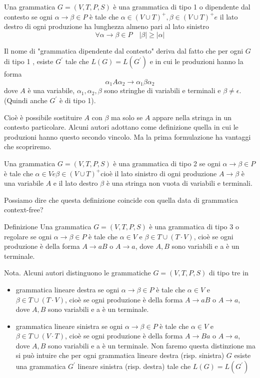 \vspace{5mm}

Una grammatica $G=(V, T, P, S)$ è una grammatica di tipo 1 o dipendente dal contesto se ogni $\alpha \rightarrow \beta \in P$ è tale che $\alpha \in(V \cup T)^{+}, \beta \in(V \cup T)^{+} e$ il lato destro di ogni produzione ha lunghezza almeno pari al lato sinistro
$$
\forall \alpha \rightarrow \beta \in P \quad |\beta| \geq |\alpha|
$$

Il nome di "grammatica dipendente dal contesto" deriva dal fatto che per ogni $G$ di tipo 1 , esiste $G^{\prime}$ tale che $L(G)=L\left(G^{\prime}\right)$ e in cui le produzioni hanno la forma
$$
\alpha_{1} A \alpha_{2} \rightarrow \alpha_{1} \beta \alpha_{2}
$$
dove $A$ è una variabile, $\alpha_{1}, \alpha_{2}, \beta$ sono stringhe di variabili e terminali e $\beta \neq \epsilon$. (Quindi anche $G^{\prime}$ è di tipo 1).

Cioè è possibile sostituire $A$ con $\beta$ ma solo se $A$ appare nella stringa in un contesto particolare.
Alcuni autori adottano come definizione quella in cui le produzioni hanno questo secondo vincolo. Ma la prima formulazione ha vantaggi che scopriremo.

\vspace{5mm}

Una grammatica $G=(V, T, P, S)$ è una grammatica di tipo 2 se ogni $\alpha \rightarrow \beta \in P$ è tale che $\alpha \in V e \beta \in(V \cup T)^{+}$cioè il lato sinistro di ogni produzione $A \rightarrow \beta$ è una variabile $A$ e il lato destro $\beta$ è una stringa non vuota di variabili e terminali.

Possiamo dire che questa definizione coincide con quella data di grammatica context-free?

\vspace{5mm}

Definizione
Una grammatica $G=(V, T, P, S)$ è una grammatica di tipo 3 o regolare se ogni $\alpha \rightarrow \beta \in P$ è tale che $\alpha \in V$ e $\beta \in T \cup(T \cdot V)$, cioè se ogni produzione è della forma $A \rightarrow a B$ o $A \rightarrow a$, dove $A, B$ sono variabili e a è un terminale.

Nota. Alcuni autori distinguono le grammatiche $G=(V, T, P, S)$ di tipo tre in
\begin{itemize}
    \item grammatica lineare destra se ogni $\alpha \rightarrow \beta \in P$ è tale che $\alpha \in V$ e $\beta \in T \cup(T \cdot V)$, cioè se ogni produzione è della forma $A \rightarrow a B $ o $A \rightarrow a$, dove $A, B$ sono variabili e a è un terminale.
    \item grammatica lineare sinistra se ogni $\alpha \rightarrow \beta \in P$ è tale che $\alpha \in V$ e $\beta \in T \cup(V \cdot T)$, cioè se ogni produzione è della forma $A \rightarrow B a $ o $ A \rightarrow a$, dove $A, B$ sono variabili e a è un terminale.
Non faremo questa distinzione ma si può intuire che per ogni grammatica lineare destra (risp. sinistra) $G$ esiste una grammatica $G^{\prime}$ lineare sinistra (risp. destra) tale che $L(G)=L\left(G^{\prime}\right)$
\end{itemize}

